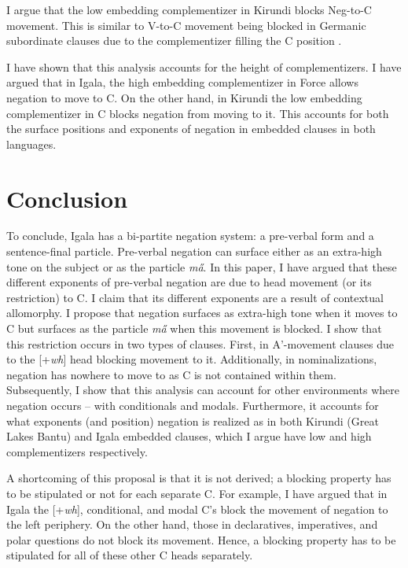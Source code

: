 \documentclass[output=paper,colorlinks,citecolor=brown,
]{langscibook}
\begin{document}
I argue that the low embedding complementizer in Kirundi blocks Neg-to-C movement. This is similar to V-to-C movement being blocked in Germanic subordinate clauses due to the complementizer filling the C\xhead{} position \citep{kiparsky1995indo}.

I have shown that this analysis accounts for the height of complementizers. I have argued that in Igala, the high embedding complementizer in Force\xhead{} allows negation to move to C\xhead{}. On the other hand, in Kirundi the low embedding complementizer in C\xhead{} blocks negation from moving to it. This accounts for both the surface positions and exponents of negation in embedded clauses in both languages.

\section{Conclusion}\label{conclusion}

To conclude, Igala has a bi-partite negation system: a pre-verbal form and a sentence-final particle. Pre-verbal negation can surface either as an extra-high tone on the subject or as the particle \textit{m\H{a}}. In this paper, I have argued that these different exponents of pre-verbal negation are due to head movement (or its restriction) %
to C\xhead{}. I claim that its different exponents are a result of contextual allomorphy. I propose that negation surfaces as extra-high tone when it moves to C\xhead{} but surfaces as the particle \textit{m\H{a}} when this movement is blocked. I show that this restriction occurs in two types of clauses. First, in A'-movement clauses due to the [+\textit{wh}] head blocking movement to it. Additionally, in nominalizations, negation has nowhere to move to as C is not contained within them. Subsequently, I show that this analysis can account for other environments where negation occurs -- with conditionals and modals. Furthermore, it accounts for what exponents (and position) negation is realized as in both Kirundi (Great Lakes Bantu) and Igala embedded clauses, which I argue have low and high complementizers respectively. 

A shortcoming of this proposal is that it is not derived; a blocking property has to be stipulated or not for each separate C. For example, I have argued that in Igala the [+\textit{wh}], conditional, and modal C\xhead{}'s block the movement of negation to the left periphery. On the other hand, those in declaratives, imperatives, and polar questions do not block its movement. Hence, a blocking property has to be stipulated for all of these other C heads separately. 
\end{document}
